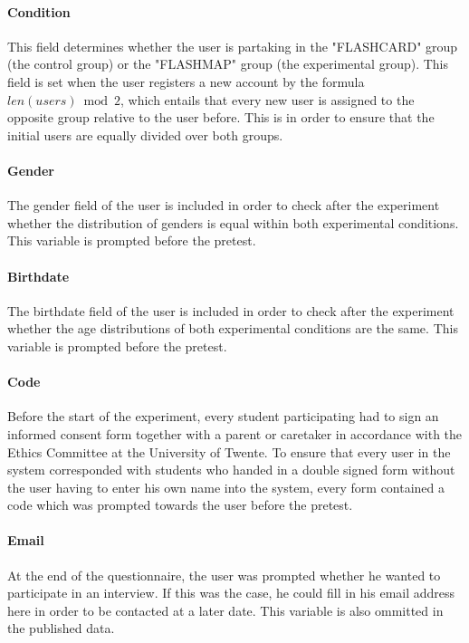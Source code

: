 \paragraph{Condition} This field determines whether the user is partaking in the "FLASHCARD" group (the control group) or the "FLASHMAP" group (the experimental group). This field is set when the user registers a new account by the formula $len(users) \bmod 2$, which entails that every new user is assigned to the opposite group relative to the user before. This is in order to ensure that the initial users are equally divided over both groups.

\paragraph{Gender} The gender field of the user is included in order to check after the experiment whether the distribution of genders is equal within both experimental conditions. This variable is prompted before the pretest.

\paragraph{Birthdate} The birthdate field of the user is included in order to check after the experiment whether the age distributions of both experimental conditions are the same. This variable is prompted before the pretest.

\paragraph{Code} Before the start of the experiment, every student participating had to sign an informed consent form together with a parent or caretaker in accordance with the Ethics Committee at the University of Twente. To ensure that every user in the system corresponded with students who handed in a double signed form without the user having to enter his own name into the system, every form contained a code which was prompted towards the user before the pretest.

\paragraph{Email} At the end of the questionnaire, the user was prompted whether he wanted to participate in an interview. If this was the case, he could fill in his email address here in order to be contacted at a later date. This variable is also ommitted in the published data.


